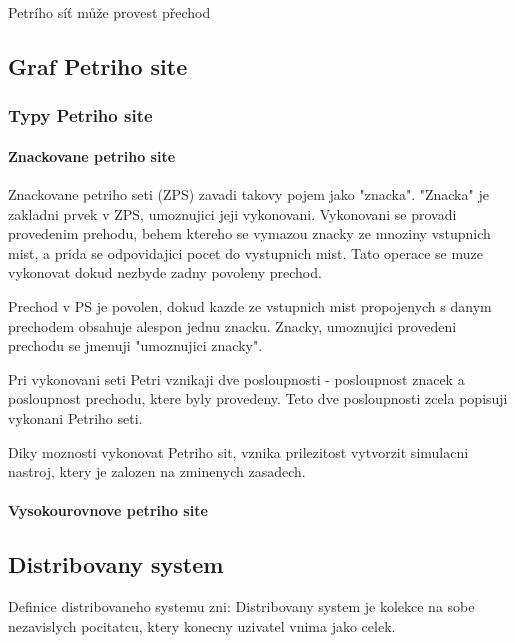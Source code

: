 Petrího síť může provest přechod 

\subsection*{Graf Petriho site}

\subsubsection{Typy Petriho site}

\paragraph*{Znackovane petriho site}
Znackovane petriho seti (ZPS) zavadi takovy pojem jako "znacka". "Znacka" je zakladni prvek v ZPS, umoznujici jeji vykonovani. Vykonovani se provadi provedenim prehodu, behem ktereho se vymazou znacky ze mnoziny vstupnich mist, a prida se odpovidajici pocet do vystupnich mist. Tato operace se muze vykonovat dokud nezbyde zadny povoleny prechod.

Prechod v PS je povolen, dokud kazde ze vstupnich mist propojenych s danym prechodem obsahuje alespon jednu znacku. Znacky, umoznujici provedeni prechodu se jmenuji "umoznujici znacky".

Pri vykonovani seti Petri vznikaji dve posloupnosti - posloupnost znacek a posloupnost prechodu, ktere byly provedeny. Teto dve posloupnosti zcela popisuji vykonani Petriho seti.

Diky moznosti vykonovat Petriho sit, vznika prilezitost vytvorzit simulacni nastroj, ktery je zalozen na zminenych zasadech. 

\paragraph*{Vysokourovnove petriho site}
\subsection*{Distribovany system}
Definice distribovaneho systemu zni:
Distribovany system je kolekce na sobe nezavislych pocitatcu, ktery konecny uzivatel vnima jako celek. 


